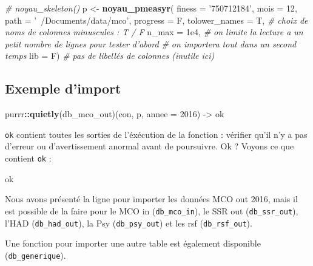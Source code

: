 \documentclass[]{book}
\newenvironment{Shaded}{\begin{snugshade}}{\end{snugshade}}
\newcommand{\KeywordTok}[1]{\textcolor[rgb]{0.13,0.29,0.53}{\textbf{#1}}}
\newcommand{\DataTypeTok}[1]{\textcolor[rgb]{0.13,0.29,0.53}{#1}}
\newcommand{\DecValTok}[1]{\textcolor[rgb]{0.00,0.00,0.81}{#1}}
\newcommand{\FloatTok}[1]{\textcolor[rgb]{0.00,0.00,0.81}{#1}}
\newcommand{\StringTok}[1]{\textcolor[rgb]{0.31,0.60,0.02}{#1}}
\newcommand{\CommentTok}[1]{\textcolor[rgb]{0.56,0.35,0.01}{\textit{#1}}}
\newcommand{\OperatorTok}[1]{\textcolor[rgb]{0.81,0.36,0.00}{\textbf{#1}}}
\newcommand{\NormalTok}[1]{#1}
\begin{document}
\begin{Shaded}
\begin{Highlighting}[]
\CommentTok{# noyau_skeleton()}
\NormalTok{p <-}\StringTok{ }\KeywordTok{noyau_pmeasyr}\NormalTok{(}
  \DataTypeTok{finess   =} \StringTok{'750712184'}\NormalTok{,}
  \DataTypeTok{mois     =} \DecValTok{12}\NormalTok{,}
  \DataTypeTok{path     =} \StringTok{'~/Documents/data/mco'}\NormalTok{,}
  \DataTypeTok{progress =}\NormalTok{ F, }
  \DataTypeTok{tolower_names =}\NormalTok{ T, }\CommentTok{# choix de noms de colonnes minuscules : T / F}
  \DataTypeTok{n_max =} \FloatTok{1e4}\NormalTok{, }\CommentTok{# on limite la lecture a un petit nombre de lignes pour tester d'abord }
  \CommentTok{# on importera tout dans un second temps}
  \DataTypeTok{lib =}\NormalTok{ F) }\CommentTok{# pas de libellés de colonnes (inutile ici)}
\end{Highlighting}
\end{Shaded}

\subsection{Exemple d'import}\label{exemple-dimport}

\begin{Shaded}
\begin{Highlighting}[]
\NormalTok{purrr}\OperatorTok{::}\KeywordTok{quietly}\NormalTok{(db_mco_out)(con,  p, }\DataTypeTok{annee =} \DecValTok{2016}\NormalTok{) ->}\StringTok{ }\NormalTok{ok }
\end{Highlighting}
\end{Shaded}

\texttt{ok} contient toutes les sorties de l'éxécution de la fonction :
vérifier qu'il n'y a pas d'erreur ou d'avertissement anormal avant de
poursuivre. Ok ? Voyons ce que contient \texttt{ok} :

\begin{Shaded}
\begin{Highlighting}[]
\NormalTok{ok}
\end{Highlighting}
\end{Shaded}

Nous avons présenté la ligne pour importer les données MCO out 2016,
mais il est possible de la faire pour le MCO in (\texttt{db\_mco\_in}),
le SSR out (\texttt{db\_ssr\_out}), l'HAD (\texttt{db\_had\_out}), la
Psy (\texttt{db\_psy\_out}) et les rsf (\texttt{db\_rsf\_out}).

Une fonction pour importer une autre table est également disponible
(\texttt{db\_generique}).
\end{document}
